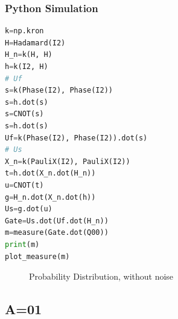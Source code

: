 \documentclass{article}
\begin{document}
\subsubsection{Python Simulation}
\begin{lstlisting}[frame=single, language=Python]
k=np.kron
H=Hadamard(I2)
H_n=k(H, H)
h=k(I2, H)
# Uf
s=k(Phase(I2), Phase(I2))
s=h.dot(s)
s=CNOT(s)
s=h.dot(s)
Uf=k(Phase(I2), Phase(I2)).dot(s)
# Us
X_n=k(PauliX(I2), PauliX(I2))
t=h.dot(X_n.dot(H_n))
u=CNOT(t)
g=H_n.dot(X_n.dot(h))
Us=g.dot(u)
Gate=Us.dot(Uf.dot(H_n))
m=measure(Gate.dot(Q00))
print(m)
plot_measure(m)
\end{lstlisting}
\begin{figure}[H]
\centering 
\noindent{}%
\caption{Probability Distribution, without noise}
\end{figure}
\subsection{A=01}
\end{document}
